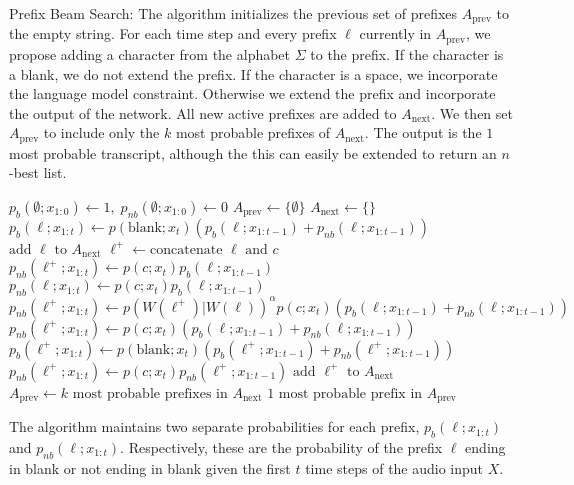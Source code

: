 \begin{algorithm}[bt]
  \caption{Prefix Beam Search: The algorithm initializes the previous set of
prefixes $A_\text{prev}$ to the empty string. For each time step and every
prefix $\ell$ currently in $A_\text{prev}$, we propose adding a character from the
alphabet $\Sigma$ to the prefix. If the character is a blank, we do not extend
the prefix. If the character is a space, we incorporate the language model
constraint. Otherwise we extend the prefix and incorporate the output of the
network. All new active prefixes are added to $A_\text{next}$. We then set
$A_\text{prev}$ to include only the $k$ most probable prefixes of $A_\text{next}$.
The output is the $1$ most probable transcript, although the this can easily
be extended to return an $n$-best list.}
  \label{alg:first_pass:decode}
  \begin{algorithmic}
    \State $p_b(\emptyset; x_{1:0}) \gets 1,\; p_{nb}(\emptyset; x_{1:0}) \gets 0$
    \State $A_{\text{prev}} \gets \{\emptyset\}$ 
      \State $A_{\text{next}} \gets \{\}$
	    \State $p_b(\ell; x_{1:t}) \gets p(\text{blank}; x_t) 
		(p_b(\ell ; x_{1:t-1}) + p_{nb}(\ell ; x_{1:t-1}))$
	    \State $\mbox{add } \ell \mbox{ to } A_{\text{next}}$
	  \Else
	    \State $\ell^+ \gets \mbox{concatenate }\ell \mbox{ and } c$
	      \State $p_{nb}(\ell^+; x_{1:t}) \gets p(c; x_t)p_b(\ell ; x_{1:t-1})$
	      \State $p_{nb}(\ell; x_{1:t}) \gets p(c; x_t)p_b(\ell ; x_{1:t-1})$
	    \State $p_{nb}(\ell^+; x_{1:t}) \gets p(W(\ell^+)| W(\ell))^\alpha 
		p(c; x_t)(p_b(\ell ; x_{1:t-1}) + p_{nb}(\ell ; x_{1:t-1}))$
	    \Else
	      \State $p_{nb}(\ell^+; x_{1:t}) \gets p(c; x_t)
		(p_b(\ell; x_{1:t-1}) + p_{nb}(\ell; x_{1:t-1}))$
	    \EndIf
	      \State $p_{b}(\ell^+; x_{1:t}) \gets p(\text{blank}; x_t)
		(p_b(\ell^+; x_{1:t-1}) + p_{nb}(\ell^+; x_{1:t-1}))$
	      \State $p_{nb}(\ell^+; x_{1:t}) \gets p(c; x_t)p_{nb}(\ell^+; x_{1:t-1})$
	    \EndIf
	    \State $\mbox{add } \ell^+ \mbox{ to } A_{\text{next}}$
	  \EndIf
	\EndFor
      \EndFor
      \State $A_{\text{prev}} \gets k 
	\text{ most probable prefixes in } A_{\text{next}}$
    \EndFor
    \State \Return $1 \text{ most probable prefix in } A_{\text{prev}}$
  \end{algorithmic}
\end{algorithm}
The algorithm maintains two separate probabilities for each prefix,
$p_{b}(\ell; x_{1:t})$ and $p_{nb}(\ell; x_{1:t})$. Respectively, these are the
probability of the prefix $\ell$ ending in blank or not ending in blank given
the first $t$ time steps of the audio input $X$.

